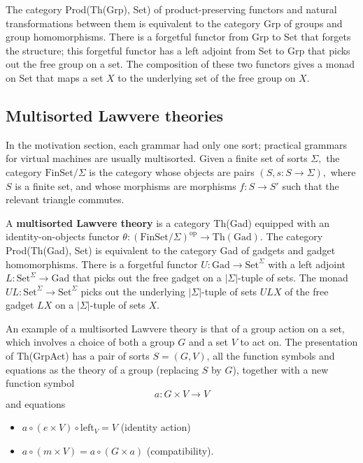\documentclass{article}
\newcommand{\maps}{\colon}
\newcommand{\FinSet}{\mathrm{FinSet}}
\newcommand{\Set}{\mathrm{Set}}
\newcommand{\Gad}{\mathrm{Gad}}
\newcommand{\op}{\mathrm{op}}
\begin{document}
The category Prod(Th(Grp), Set) of product-preserving functors and natural transformations between them is equivalent to the category Grp of groups and group homomorphisms.  There is a forgetful functor from Grp to Set that forgets the structure; this forgetful functor has a left adjoint from Set to Grp that picks out the free group on a set.  The composition of these two functors gives a monad on Set that maps a set $X$ to the underlying set of the free group on $X.$

\subsection{Multisorted Lawvere theories}
In the motivation section, each grammar had only one sort; practical grammars for virtual machines are usually multisorted.  Given a finite set of sorts $\Sigma,$ the category $\FinSet/\Sigma$ is the category whose objects are pairs $(S, s\maps S\to \Sigma),$ where $S$ is a finite set, and whose morphisms are morphisms $f\maps S \to S'$ such that the relevant triangle commutes.

A {\bf multisorted Lawvere theory} is a category Th(Gad) equipped with an identity-on-objects functor ${\theta\maps (\FinSet/\Sigma)^\op \to \mathrm{Th(Gad)}.}$  The category Prod(\allowbreak Th(Gad), Set) is equivalent to the category Gad of gadgets and gadget homomorphisms.  There is a forgetful functor ${U\maps \Gad \to \Set^\Sigma}$ with a left adjoint ${L\maps \Set^\Sigma \to \Gad}$ that picks out the free gadget on a $|\Sigma|$-tuple of sets.  The monad ${UL\maps \Set^\Sigma \to \Set^\Sigma}$ picks out the underlying $|\Sigma|$-tuple of sets $ULX$ of the free gadget $LX$ on a $|\Sigma|$-tuple of sets $X$.

An example of a multisorted Lawvere theory is that of a group action on a set, which involves a choice of both a group $G$ and a set $V$ to act on.  The presentation of Th(GrpAct) has a pair of sorts $S = (G, V)$, all the function symbols and equations as the theory of a group (replacing $S$ by $G$), together with a new function symbol
\[ a\maps G \times V \to V \]
and equations
\begin{itemize}
  \item $a \circ (e \times V) \circ \mathrm{left}_V = V$ (identity action)
  \item $a \circ (m \times V) = a \circ (G \times a)$ (compatibility).
\end{itemize}
\end{document}
